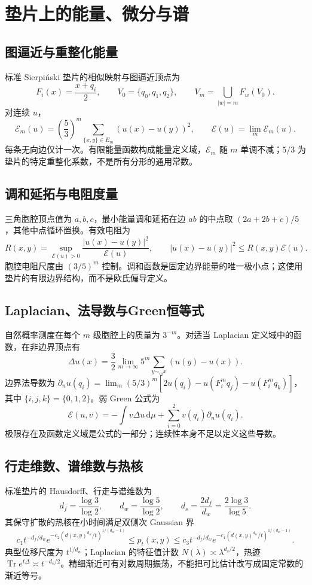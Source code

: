 \documentclass[../main.tex]{subfiles}
\begin{document}
\section{垫片上的能量、微分与谱}
\subsection{图逼近与重整化能量}
标准 Sierpi\'nski 垫片的相似映射与图逼近顶点为
\[
F_i(x)=\frac{x+q_i}{2},\qquad V_0=\{q_0,q_1,q_2\},\qquad
V_m=\bigcup_{|w|=m}F_w(V_0).
\]
对连续 $u$，
\[
\mathcal E_m(u)=\left(\frac53\right)^m\sum_{\{x,y\}\in E_m}(u(x)-u(y))^2,
\qquad\mathcal E(u)=\lim_m\mathcal E_m(u).
\]
每条无向边仅计一次。有限能量函数构成能量定义域，$\mathcal E_m$ 随 $m$ 单调不减；$5/3$ 为垫片的特定重整化系数，不是所有分形的通用常数。
\subsection{调和延拓与电阻度量}
三角胞腔顶点值为 $a,b,c$，最小能量调和延拓在边 $ab$ 的中点取 $(2a+2b+c)/5$，其他中点循环置换。有效电阻为
\[
R(x,y)=\sup_{\mathcal E(u)>0}\frac{|u(x)-u(y)|^2}{\mathcal E(u)},\qquad
|u(x)-u(y)|^2\le R(x,y)\mathcal E(u).
\]
胞腔电阻尺度由 $(3/5)^m$ 控制。调和函数是固定边界能量的唯一极小点；这使用垫片的有限边界结构，而不是欧氏偏导定义。
\subsection{Laplacian、法导数与Green恒等式}
自然概率测度在每个 $m$ 级胞腔上的质量为 $3^{-m}$。对适当 Laplacian 定义域中的函数，在非边界顶点有
\[
\Delta u(x)=\frac32\lim_{m\to\infty}5^m\sum_{y\sim_mx}(u(y)-u(x)).
\]
边界法导数为 $\partial_nu(q_i)=\lim_m(5/3)^m[2u(q_i)-u(F_i^mq_j)-u(F_i^mq_k)]$，其中 $\{i,j,k\}=\{0,1,2\}$。弱 Green 公式为
\[
\mathcal E(u,v)=-\int v\Delta u\,\mathrm d\mu+\sum_{i=0}^2v(q_i)\partial_nu(q_i).
\]
极限存在及函数定义域是公式的一部分；连续性本身不足以定义这些导数。
\subsection{行走维数、谱维数与热核}
标准垫片的 Hausdorff、行走与谱维数为
\[
d_f=\frac{\log3}{\log2},\qquad d_w=\frac{\log5}{\log2},\qquad d_s=\frac{2d_f}{d_w}=\frac{2\log3}{\log5}.
\]
其保守扩散的热核在小时间满足双侧次 Gaussian 界
\[
c_1t^{-d_f/d_w}e^{-c_2(d(x,y)^{d_w}/t)^{1/(d_w-1)}}
\le p_t(x,y)\le
c_3t^{-d_f/d_w}e^{-c_4(d(x,y)^{d_w}/t)^{1/(d_w-1)}}.
\]
典型位移尺度为 $t^{1/d_w}$；Laplacian 的特征值计数 $N(\lambda)\asymp\lambda^{d_s/2}$，热迹 $\operatorname{Tr}e^{t\Delta}\asymp t^{-d_s/2}$。精细渐近可有对数周期振荡，不能把可比估计改写成固定常数的渐近等号。
\end{document}
